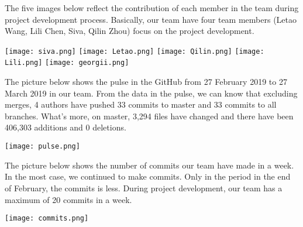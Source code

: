 \documentclass{article}
\begin{document}
The five images below reflect the contribution of each member in the team during project development process. Basically, our team have four team members (Letao Wang, Lili Chen, Siva, Qilin Zhou) focus on the project development.\newline


\begin{minipage}
\centering
\texttt{[image: siva.png]}
\texttt{[image: Letao.png]}
\texttt{[image: Qilin.png]}
\texttt{[image: Lili.png]}
\texttt{[image: georgii.png]}
\label{fig:contribution in each team members}
\end{minipage}

The picture below shows the pulse in the GitHub from 27 February 2019 to 27 March 2019 in our team. From the data in the pulse, we can know that excluding merges, 4 authors have pushed 33 commits to master and 33 commits to all branches. What’s more, on master, 3,294 files have changed and there have been 406,303 additions and 0 deletions.\newline

\begin{minipage}
\centering
\texttt{[image: pulse.png]}
\label{fig:number of pulse}
\end{minipage}


The picture below shows the number of commits our team have made in a week. In the most case, we continued to make commits. Only in the period in the end of February, the commits is less. During project development, our team has a maximum of 20 commits in a week.\newline

\begin{minipage}
\centering
\texttt{[image: commits.png]}
\label{fig:Number of commits}
\end{minipage}
\end{document}
